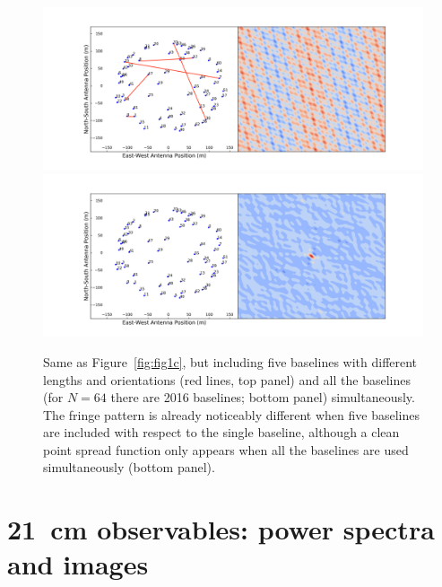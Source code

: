 %
\begin{figure}[]
\begin{center}
\includegraphics[width=1.\textwidth]{Bernardi/fringe_5bls}
\includegraphics[width=1.\textwidth]{Bernardi/fringe_all}
\end{center}
\caption{Same as Figure~\ref{fig:fig1c}, but including five baselines with different lengths and orientations (red lines, top panel) and all the baselines (for $N = 64$ there are 2016 baselines; bottom panel) simultaneously. The fringe pattern is already noticeably different when five baselines are included with respect to the single baseline, although a clean point spread function only appears when all the baselines are used simultaneously (bottom panel).}
\label{fig:fig1d}
\end{figure}





\section{21~cm observables: power spectra and images}
\label{sec:observables}

